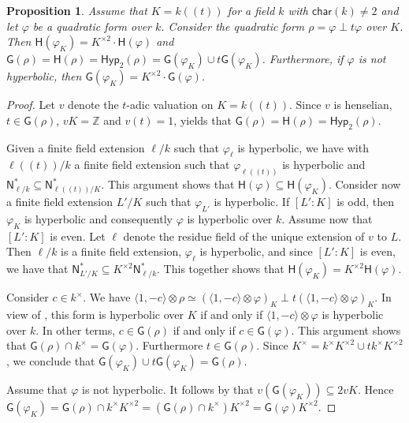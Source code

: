 \documentclass[twoside,11pt]{amsart}
\numberwithin{equation}{section}
\newtheorem{prop}[equation]{Proposition}
\theoremstyle{definition}
\newcommand\N{\operatorname{N}}
\newcommand{\car}{\mathsf{char}}
\newcommand{\vf}{\varphi}
\newcommand{\mg}[1]{{#1}^{\times}}
\newcommand{\sq}[1]{{#1}^{\times 2}}
\newcommand{\la}{\langle}
\newcommand{\ra}{\rangle}
\renewcommand{\N}{\mathsf{N}}
\newcommand{\G}{\mathsf{G}}
\renewcommand{\H}{\mathsf{H}}
\newcommand{\Hyp}{\mathsf{Hyp}}
\newcommand{\zz}{\mathbb{Z}}
\begin{document}
\begin{prop}
    Assume that $K=k(\!(t)\!)$ for a field $k$ with $\car(k)\neq 2$ and let $\varphi$ be a quadratic form over $k$. 
    Consider the quadratic form $\rho=\varphi\perp t\varphi$ over $K$.
    Then $\H(\varphi_K)=\sq{K}\cdot\H(\varphi)$ and
    $\G(\rho)=\H(\rho)=\Hyp_2(\rho)=\G(\varphi_{K})\cup t\G(\varphi_{K})$. 
    Furthermore, if $\varphi$ is not hyperbolic, then $\G(\varphi_{K})=\sq{K}\cdot\G(\varphi)$.
\end{prop}
\begin{proof}
    Let $v$ denote the $t$-adic valuation on $K=k(\!(t)\!)$. 
    Since $v$ is henselian,  $t\in\G(\rho)$, $vK=\zz$ and $v(t)=1$,  yields that $\G(\rho)=\H(\rho)=\Hyp_2(\rho)$.

    Given a finite field extension $\ell/k$ such that $\varphi_\ell$ is hyperbolic, we have with $\ell(\!(t)\!)/k$ a finite field extension such that $\varphi_{\ell(\!(t)\!)}$ is hyperbolic and 
    $\N_{\ell/k}^\ast\subseteq\N_{\ell(\!(t)\!)/K}^\ast$.
    This argument shows that $\H(\varphi)\subseteq \H(\varphi_K)$.
    Consider now a finite field extension $L'/K$ such that $\vf_{L'}$ is hyperbolic.
    If $[L':K]$ is odd, then $\varphi_K$ is hyperbolic and consequently $\varphi$ is hyperbolic over $k$.
    Assume now that $[L':K]$ is even.
    Let $\ell$ denote the residue field of the unique  extension of $v$ to $L$.
    Then $\ell/k$ is a finite field extension, $\varphi_\ell$ is hyperbolic, and since $[L':K]$ is even, we  have that
    $\N_{L'/K}^\ast\subseteq\sq{K}\N_{\ell/k}^\ast$.
    This together shows that $\H(\vf_K)= \sq{K}\H(\vf)$.

    Consider $c\in\mg{k}$. We have 
    $\la 1,-c\ra\otimes \rho \simeq (\la 1,-c\ra\otimes \varphi)_K\perp t(\la 1,-c\ra\otimes \varphi)_K$.
    In view of \cite[Chap.~VI, Theorem 1.4]{Lam05}, this form is hyperbolic over $K$ if and only if $\la 1,-c\ra\otimes \varphi$ is hyperbolic over $k$. In other terms, $c\in\G(\rho)$ if and only if $c\in\G(\varphi)$.
    This argument shows that $\G(\rho)\cap\mg{k}=\G(\varphi)$.
    Furthermore $t\in\G(\rho)$.
    Since $\mg{K}=\mg{k}\sq{K}\cup t\mg{k}\sq{K}$, we conclude that $\G(\varphi_K)\cup t\G(\varphi_K)= \G(\rho)$.

    Assume that $\varphi$ is not hyperbolic. It follows by \cite[Chap.~VI, Theorem 1.4]{Lam05} that $v(\G(\varphi_K))\subseteq 2vK$. Hence $\G(\varphi_K)=\G(\rho)\cap \mg{k}\sq{K}=(\G(\rho)\cap\mg{k})\sq{K}=\G(\varphi)\sq{K}$.
\end{proof}
\end{document}
